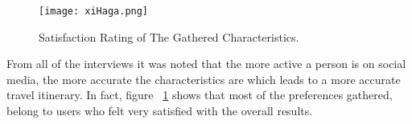 






\begin{figure}[h]
\centering
\texttt{[image: xiHaga.png]}
\caption{Satisfaction Rating of The Gathered Characteristics.}
\label{Satisfaction}
\end{figure}

From all of the interviews it was noted that the more active a person
is on social media, the more accurate the characteristics are which leads to a more accurate 
travel itinerary. In fact, figure ~\ref{Satisfaction}  shows that most of the
preferences gathered, belong to users who felt very satisﬁed with the overall results.



